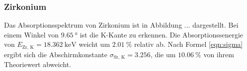 \subsubsection{Zirkonium}

Das Absorptionsspektrum von Zirkonium ist in Abbildung ... dargestellt.
Bei einem Winkel von $\SI{9,65}{\degree}$ ist die K-Kante zu erkennen. Die
Absorptionssenergie von $E_\text{Zr, K} = \SI{18.362}{\kilo\eV}$ weicht
um $\SI{2.01}{\percent}$ relativ ab. Nach Formel \eqref{eqn:sigma} ergibt 
sich die Abschirmkonstante $\sigma_\text{Sr, K} = 3.256$, die um 
$\SI{10.06}{\percent}$ von ihrem Theoriewert abweicht.






